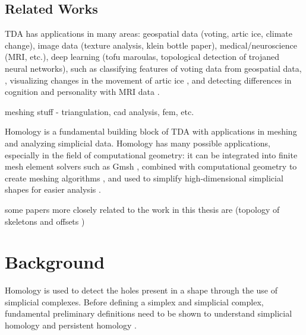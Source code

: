 \documentclass[ma]{uncgdissertationexp}
\theoremstyle{plain}
\theoremstyle{definition}
\theoremstyle{remark}
\begin{document}
\section{Related Works}
\par TDA has applications in many areas: geospatial data (voting, artic ice, climate change), image data (texture analysis, klein bottle paper), medical/neuroscience (MRI, etc.), deep learning (tofu maroulas, topological detection of trojaned neural networks), 
such as classifying features of voting data from geospatial data, \cite{geospatial_voting}, visualizing changes in the movement of artic ice \cite{jocelyn_thesis}, and detecting differences in cognition and personality with MRI data \cite{TDA_MRI}.
\par meshing stuff - triangulation, cad analysis, fem, etc.
\par Homology is a fundamental building block of TDA with applications in meshing and analyzing simplicial data. Homology has many possible applications, especially in the field of computational geometry: it can be integrated into finite mesh element solvers such as Gmsh \cite{homology_fem_computation}, combined with computational geometry to create meshing algorithms \cite{3d_vol_iso_mesh}, and used to simplify high-dimensional simplicial shapes for easier analysis \cite{efficient_homology_preserving}\cite{mesh_enhanced_persistent}.
\par some papers more closely related to the work in this thesis are (topology of skeletons and offsets \cite{efficient_homology_preserving})
\chapter{Background}

\par Homology is used to detect the holes present in a shape through the use of simplicial complexes. Before defining a simplex and simplicial complex, fundamental preliminary definitions need to be shown to understand simplicial homology and persistent homology \cite{Needham_2019}.
\end{document}
